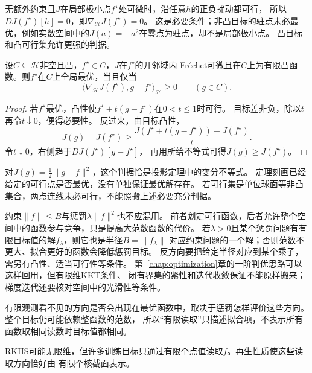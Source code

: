 无额外约束且$J$在局部极小点$f^\star$处可微时，沿任意$h$的正负扰动都可行，
所以$DJ(f^\star)[h]=0$，即$\nabla_{\mathcal H}J(f^\star)=0$。
这是必要条件；非凸目标的驻点未必最优，例如实数空间中的$J(a)=-a^2$在零点为驻点，却不是局部极小点。
凸目标和凸可行集允许更强的判据。

\begin{theorem}[凸函数优化的一阶判据]
\label{thm:functional-convex-optimality}
设$C\subseteq\mathcal H$非空且凸，$f^\star\in C$，$J$在$f^\star$的开邻域内
Fréchet可微且在$C$上为有限凸函数。则$f^\star$在$C$上全局最优，当且仅当
\begin{equation}
 \langle\nabla_{\mathcal H}J(f^\star),g-f^\star\rangle_{\mathcal H}\geq0
 \qquad(g\in C).
 \label{eq:functional-convex-optimality}
\end{equation}
\end{theorem}
\begin{proof}
若$f^\star$最优，凸性使$f^\star+t(g-f^\star)$在$0<t\leq1$时可行。
目标差非负，除以$t$再令$t\downarrow0$，便得必要性。
反过来，由目标凸性，
\[
 J(g)-J(f^\star)\geq
 \frac{J(f^\star+t(g-f^\star))-J(f^\star)}{t}.
\]
令$t\downarrow0$，右侧趋于$DJ(f^\star)[g-f^\star]$，
再用所给不等式可得$J(g)\geq J(f^\star)$。
\end{proof}
对$J(g)=\frac12\lVert g-f\rVert^2$，这个判据恰是投影定理中的变分不等式。
定理刻画已经给定的可行点是否最优，没有单独保证最优解存在。
若可行集是单位球面等非凸集合，两点连线未必可行，不能照搬上述必要充分判据。

约束$\lVert f\rVert\leq B$与惩罚$\lambda\lVert f\rVert^2$也不应混用。
前者划定可行函数，后者允许整个空间中的函数参与竞争，只是提高大范数函数的代价。
若$\lambda>0$且某个惩罚问题有有限目标值的解$f_\lambda$，则它也是半径$B=\lVert f_\lambda\rVert$
对应约束问题的一个解；否则范数不更大、拟合更好的函数会降低惩罚目标。
反方向要把给定半径对应到某个乘子，需另有凸性、适当可行性等条件。
第~\ref{chap:optimization}章的一阶判优思路可以这样回用，但有限维KKT条件、
闭有界集的紧性和迭代收敛保证不能原样搬来；梯度迭代还要核对空间中的光滑性等条件。


有限观测看不见的方向是否会出现在最优函数中，取决于惩罚怎样评价这些方向。
整个目标仍可能依赖整函数的范数，
所以“有限读取”只描述拟合项，不表示所有函数取相同读数时目标值都相同。


RKHS可能无限维，但许多训练目标只通过有限个点值读取$f$。再生性质使这些读取方向恰好由
有限个核截面表示。

